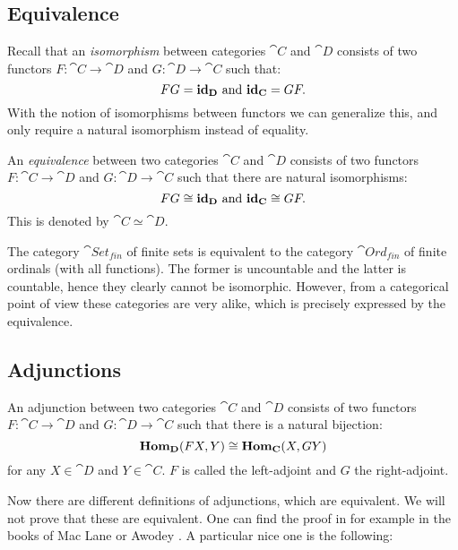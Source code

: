 \subsection{Equivalence}
Recall that an \emph{isomorphism} between categories $\cat{C}$ and $\cat{D}$ consists of two functors $F:\cat{C} \to \cat{D}$ and $G: \cat{D} \to \cat{C}$ such that:
$$ FG = \mathbf{id}_{\mathbf{D}} \text{ and } \mathbf{id}_{\mathbf{C}} = GF. $$
With the notion of isomorphisms between functors we can generalize this, and only require a natural isomorphism instead of equality.

\begin{definition}
	An \emph{equivalence} between two categories $\cat{C}$ and $\cat{D}$ consists of two functors $F:\cat{C} \to \cat{D}$ and $G: \cat{D} \to \cat{C}$ such that there are natural isomorphisms:
	$$ FG \cong \mathbf{id}_{\mathbf{D}} \text{ and } \mathbf{id}_{\mathbf{C}} \cong GF. $$
	This is denoted by $\cat{C} \simeq \cat{D}$.
\end{definition}

\begin{example}
	The category $\cat{Set_{fin}}$ of finite sets is equivalent to the category $\cat{Ord_{fin}}$ of finite ordinals (with all functions). The former is uncountable and the latter is countable, hence they clearly cannot be isomorphic. However, from a categorical point of view these categories are very alike, which is precisely expressed by the equivalence.
\end{example}

\subsection{Adjunctions}
\begin{definition}
	An adjunction between two categories $\cat{C}$ and $\cat{D}$ consists of two functors $F:\cat{C} \to \cat{D}$ and $G: \cat{D} \to \cat{C}$ such that there is a natural bijection:
	$$ \mathbf{Hom}_{\mathbf{D}}(FX, Y) \cong \mathbf{Hom}_{\mathbf{C}}(X, GY) $$
	for any $X \in \cat{D}$ and $Y \in \cat{C}$.
	$F$ is called the left-adjoint and $G$ the right-adjoint.
\end{definition}

Now there are different definitions of adjunctions, which are equivalent. We will not prove that these are equivalent. One can find the proof in for example in the books of Mac Lane \cite{maclane} or Awodey \cite{awodey}. A particular nice one is the following:

